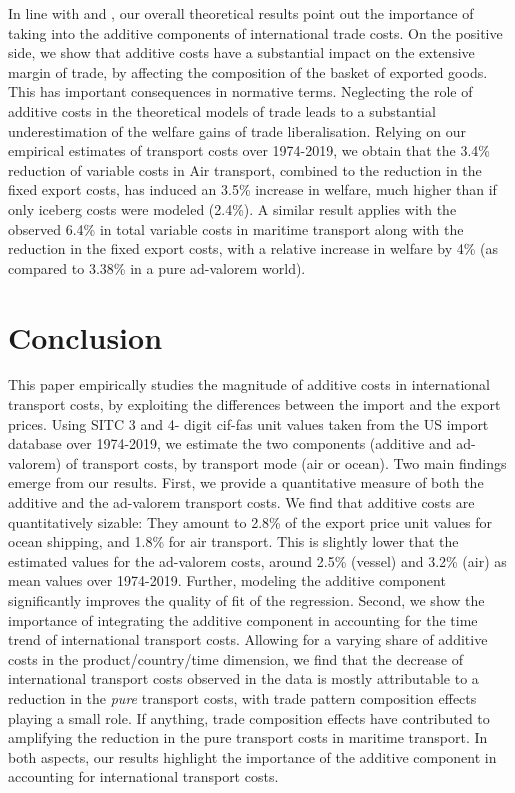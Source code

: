 \documentclass[a4paper,11pt]{article}
\begin{document}
In line with \cite{sorensen2014} and \cite{Irrazabal_2015}, our overall theoretical results point out the importance of taking into the additive components of international trade costs. On the positive side, we show that additive costs have a substantial impact on the extensive margin of trade, by affecting the composition of the basket of exported goods. This has important consequences in normative terms. Neglecting the role of additive costs in the theoretical models of trade leads to a substantial underestimation of the welfare gains of trade liberalisation. Relying on our empirical estimates of transport costs over 1974-2019, we obtain that the 3.4\% reduction of variable costs in Air transport, combined to the reduction in the fixed export costs, has induced an 3.5\% increase in welfare, much higher than if only iceberg costs were modeled (2.4\%). A similar result applies with the observed 6.4\% in total variable costs in maritime transport along with the reduction in the fixed export costs, with a relative increase in welfare by 4\% (as compared to 3.38\% in a pure ad-valorem world).




\section{Conclusion \label{sec:conclu}}

This paper empirically studies the magnitude of additive costs in international transport costs, by exploiting the differences between the import and the export prices.
Using SITC 3 and 4- digit cif-fas unit values taken from the US import database over 1974-2019, we estimate the two components (additive and ad-valorem) of transport costs, by transport mode (air or ocean).
Two main findings emerge from our results.
First, we provide a quantitative measure of both the additive and the ad-valorem transport costs.
We find that additive costs are quantitatively sizable: They amount to 2.8\% of the export price unit values for ocean shipping, and 1.8\% for air transport.
This is slightly lower that the estimated values for the ad-valorem costs, around  2.5\% (vessel) and 3.2\% (air) as mean values over 1974-2019.
Further, modeling the additive component significantly improves the quality of fit of the regression.
Second, we show the importance of integrating the additive component in accounting for the time trend of international transport costs.
Allowing for a varying share of additive costs in the product/country/time dimension, we find that the decrease of international transport costs observed in the data is mostly attributable to a reduction in the \textit{pure} transport costs, with trade pattern composition effects playing a small role.
If anything, trade composition effects have contributed to amplifying the reduction in the pure transport costs in maritime transport.
In both aspects, our results highlight the importance of the additive component in accounting for international transport costs.
\end{document}
